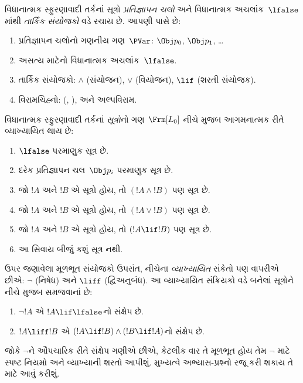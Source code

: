 વિધાનાત્મક સ્ફુરણાવાદી તર્કનાં સૂત્રો
\emph{પ્રતિજ્ઞાપન ચલો} અને વિધાનાત્મક
અચલાંક~$\lfalse$માંથી \emph{તાર્કિક સંયોજકો} વડે રચાય છે.
આપણી પાસે છે:

\begin{enumerate}
\item પ્રતિજ્ઞાપન ચલોનો ગણનીય ગણ~$\PVar$:
  $\Obj p_0$,
  $\Obj p_1$, \dots
  \item અસત્ય માટેનો વિધાનાત્મક અચલાંક~$\lfalse$.
\item તાર્કિક સંયોજકો: $\land$ (સંયોજન), $\lor$ (વિયોજન),
  $\lif$ (શરતી સંયોજક).
\item વિરામચિહ્નો: (, ), અને અલ્પવિરામ.
\end{enumerate}

\begin{defn}[સૂત્ર]
 વિધાનાત્મક સ્ફુરણાવાદી તર્કનાં
\emph{સૂત્રો}નો ગણ~$\Frm[L_0]$ નીચે મુજબ આગમનાત્મક
રીતે વ્યાખ્યાયિત થાય છે:
\begin{enumerate}
\item $\lfalse$ પરમાણુક સૂત્ર છે.

\item દરેક પ્રતિજ્ઞાપન ચલ~$\Obj p_i$ પરમાણુક
  સૂત્ર છે.

\item જો $!A$ અને $!B$ એ સૂત્રો હોય, તો $(!A \land
  !B)$ પણ સૂત્ર છે.

\item જો $!A$ અને $!B$ એ સૂત્રો હોય, તો $(!A \lor !B)$
  પણ સૂત્ર છે.

\item જો $!A$ અને $!B$ એ સૂત્રો હોય, તો $(!A \lif !B)$
  પણ સૂત્ર છે.

\item આ સિવાય બીજું કશું સૂત્ર નથી.
\end{enumerate}
\end{defn}

ઉપર જણાવેલા મૂળભૂત સંયોજકો ઉપરાંત, નીચેના \emph{વ્યાખ્યાયિત}
સંકેતો પણ વાપરીએ છીએ: $\lnot$ (નિષેધ) અને $\liff$
(દ્વિઅનુબંધ). આ વ્યાખ્યાયિત સંક્રિયકો વડે બનેલાં
સૂત્રોને નીચે મુજબ સમજવાનાં છે:
\begin{enumerate}
\item $\lnot !A$ એ $!A \lif \lfalse$નો સંક્ષેપ છે.

\item $!A \liff !B$ એ $(!A \lif !B) \land (!B
  \lif !A)$નો સંક્ષેપ છે.
\end{enumerate}

જોકે $\lnot$ને ઔપચારિક રીતે સંક્ષેપ ગણીએ છીએ, કેટલીક વાર
તે મૂળભૂત હોય તેમ $\lnot$ માટે સ્પષ્ટ નિયમો અને વ્યાખ્યાની
શરતો આપીશું. મુખ્યત્વે અભ્યાસ-પ્રશ્નો રજૂ કરી શકાય તે માટે
આવું કરીશું.
\endgroup


